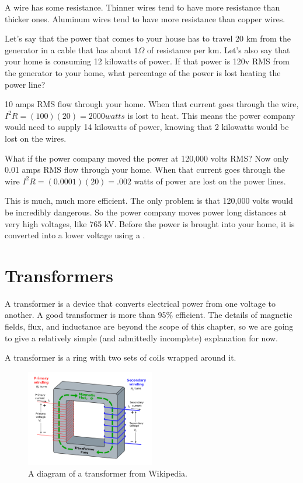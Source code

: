 A wire has some resistance. Thinner wires tend to have more resistance
than thicker ones. Aluminum wires tend to have more resistance than
copper wires.

Let's say that the power that comes to your house has to travel 20 km
from the generator in a cable that has about $1 \Omega$ of resistance
per km.  Let's also say that your home is consuming 12 kilowatts of power. If that power is 120v RMS from the generator to your home, what
percentage of the power is lost heating the power line? 

10 amps RMS flow through your home. When that current goes through the wire, $I^2
R = (100)(20) = 2000 watts$ is lost to heat. This means the power company would need to supply 14 kilowatts of power,
knowing that 2 kilowatts would be lost on the wires.

What if the power company moved the power at 120,000 volts RMS? Now
only 0.01 amps RMS flow through your home. When that current goes
through the wire $I^2R = (0.0001)(20) = .002$ watts of power are lost
on the power lines.

This is much, much more efficient. The only problem is that 120,000 volts
would be incredibly dangerous.  So the power company moves power long
distances at very high voltages, like 765 kV.  Before the power is
brought into your home, it is converted into a lower voltage using a
.
\section{Transformers}

A transformer is a device that converts electrical power from one
voltage to another. A good transformer is more than 95\% efficient. The
details of magnetic fields, flux, and inductance are beyond the scope
of this chapter, so we are going to give a relatively simple (and admittedly incomplete) explanation for now.

A transformer is a ring with two sets of coils wrapped around it.
\begin{figure}[htbp]
    \centering
    \includegraphics[width=0.5\textwidth]{transformer.png}
    \caption{A diagram of a transformer from Wikipedia.}
    \label{fig:transformer}
\end{figure}

